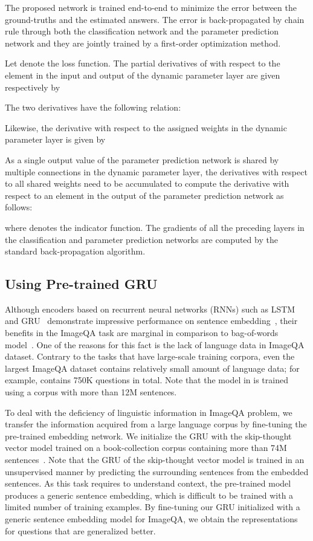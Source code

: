 \documentclass[10pt,twocolumn,letterpaper]{article}
\begin{document}
The proposed network is trained end-to-end to minimize the error between the ground-truths and the estimated answers.
The error is back-propagated by chain rule through both the classification network and the parameter prediction network and they are jointly trained by a first-order optimization method.




Let  denote the loss function.
The partial derivatives of  with respect to the  element in the input and output of the dynamic parameter layer are given respectively by 

The two derivatives have the following relation:

Likewise, the derivative with respect to the assigned weights in the dynamic parameter layer is given by

As a single output value of the parameter prediction network is shared by multiple connections in the dynamic parameter layer, the derivatives with respect to all shared weights need to be accumulated to compute the derivative with respect to an element in the output of the parameter prediction network as follows:

where  denotes the indicator function.
The gradients of all the preceding layers in the classification and parameter prediction networks are computed by the standard back-propagation algorithm.


\subsection{Using Pre-trained GRU}


Although encoders based on recurrent neural networks (RNNs) such as LSTM~\cite{LSTM} and GRU~\cite{chung2014empirical} demonstrate impressive performance on sentence embedding~\cite{mikolov2010recurrent, sutskever2014sequence}, their benefits in the ImageQA task are marginal in comparison to bag-of-words model~\cite{mren2015}.
One of the reasons for this fact is the lack of language data in ImageQA dataset.
Contrary to the tasks that have large-scale training corpora, even the largest ImageQA dataset contains relatively small amount of language data; for example, \cite{VQA} contains 750K questions in total.
Note that the model in \cite{sutskever2014sequence} is trained using a corpus with more than 12M sentences.

To deal with the deficiency of linguistic information in ImageQA problem, we transfer the information acquired from a large language corpus by fine-tuning the pre-trained embedding network.
We initialize the GRU with the skip-thought vector model trained on a book-collection corpus containing more than 74M sentences~\cite{Skipthought}.
Note that the GRU of the skip-thought vector model is trained in an unsupervised manner by predicting the surrounding sentences from the embedded sentences.
As this task requires to understand context, the pre-trained model produces a generic sentence embedding, which is difficult to be trained with a limited number of training examples.
By fine-tuning our GRU initialized with a generic sentence embedding model for ImageQA, we obtain the representations for questions that are generalized better.
\end{document}
